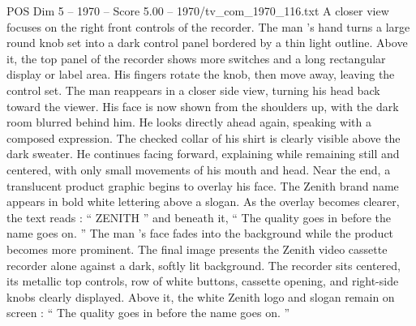 \begin{textsample}{POS Dim 5 – 1970 – Score 5.00 – 1970/tv\_com\_1970\_116.txt}
A closer view focuses on the right front controls of the recorder.
The man ’s hand turns a large round knob set into a dark control panel bordered by a thin light outline.
Above it, the top panel of the recorder shows more switches and a long rectangular display or label area.
His fingers rotate the knob, then move away, leaving the control set.
The man reappears in a closer side view, turning his head back toward the viewer.
His face is now shown from the shoulders up, with the dark room blurred behind him.
He looks directly ahead again, speaking with a composed expression.
The checked collar of his shirt is clearly visible above the dark sweater.
He continues facing forward, explaining while remaining still and centered, with only small movements of his mouth and head.
Near the end, a translucent product graphic begins to overlay his face.
The Zenith brand name appears in bold white lettering above a slogan.
As the overlay becomes clearer, the text reads : “ ZENITH ” and beneath it, “ The quality goes in before the name goes on. ” The man ’s face fades into the background while the product becomes more prominent.
The final image presents the Zenith video cassette recorder alone against a dark, softly lit background.
The recorder sits centered, its metallic top controls, row of white buttons, cassette opening, and right-side knobs clearly displayed.
Above it, the white Zenith logo and slogan remain on screen : “ The quality goes in before the name goes on. ”

\end{textsample}
